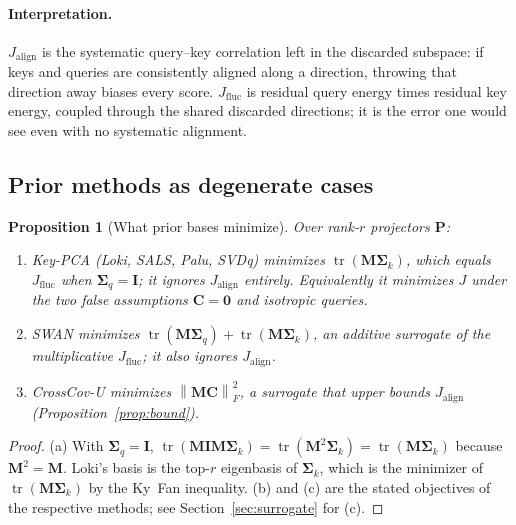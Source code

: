 \documentclass[10pt]{article}
\newcommand{\tr}{\operatorname{tr}}
\newcommand{\norm}[1]{\left\lVert #1 \right\rVert}
\newcommand{\fro}[1]{\norm{#1}_F}
\newcommand{\bC}{\mathbf{C}}
\newcommand{\bM}{\mathbf{M}}
\newcommand{\bP}{\mathbf{P}}
\newcommand{\bI}{\mathbf{I}}
\newcommand{\Sq}{\bm{\Sigma}_q}
\newcommand{\Sk}{\bm{\Sigma}_k}
\newcommand{\Jal}{J_{\mathrm{align}}}
\newcommand{\Jfl}{J_{\mathrm{fluc}}}
\newcommand{\method}{CrossCov-U}
\theoremstyle{plain}
\newtheorem{proposition}[theorem]{Proposition}
\theoremstyle{definition}
\theoremstyle{remark}
\begin{document}
\paragraph{Interpretation.}
$\Jal$ is the systematic query--key correlation left in the discarded
subspace: if keys and queries are consistently aligned along a direction,
throwing that direction away biases every score. $\Jfl$ is residual query
energy times residual key energy, coupled through the shared discarded
directions; it is the error one would see even with no systematic alignment.

\subsection{Prior methods as degenerate cases}
\label{sec:degenerate}

\begin{proposition}[What prior bases minimize]
\label{prop:degenerate}
Over rank-$r$ projectors $\bP$:
\begin{enumerate}[leftmargin=*,itemsep=1pt]
  \item[(a)] Key-PCA (Loki, SALS, Palu, SVDq) minimizes $\tr(\bM\Sk)$, which
  equals $\Jfl$ when $\Sq=\bI$; it ignores $\Jal$ entirely. Equivalently it
  minimizes $J$ under the two false assumptions $\bC=\mathbf{0}$ and
  isotropic queries.
  \item[(b)] SWAN minimizes $\tr(\bM\Sq)+\tr(\bM\Sk)$, an additive surrogate
  of the multiplicative $\Jfl$; it also ignores $\Jal$.
  \item[(c)] \method{} minimizes $\fro{\bM\bC}^2$, a surrogate that upper
  bounds $\Jal$ (Proposition~\ref{prop:bound}).
\end{enumerate}
\end{proposition}
\begin{proof}
(a) With $\Sq=\bI$, $\tr(\bM\bI\bM\Sk)=\tr(\bM^2\Sk)=\tr(\bM\Sk)$ because
$\bM^2=\bM$. Loki's basis is the top-$r$ eigenbasis of $\Sk$, which is the
minimizer of $\tr(\bM\Sk)$ by the Ky~Fan inequality. (b) and (c) are the
stated objectives of the respective methods; see Section~\ref{sec:surrogate}
for (c).
\end{proof}
\end{document}
